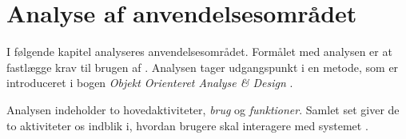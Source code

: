 \chapter{Analyse af anvendelsesområdet}
\label{chap:analyseafao}

I følgende kapitel analyseres anvendelsesområdet. Formålet med analysen er at fastlægge krav til brugen af \Foodl{}. Analysen tager udgangspunkt i en metode, som er introduceret i bogen \emph{Objekt Orienteret Analyse \& Design} \cite[s. ~113]{ooad}. 

Analysen indeholder to hovedaktiviteter, \textit{brug} og \textit{funktioner}. Samlet set giver de to aktiviteter os indblik i, hvordan brugere skal interagere med systemet %
\cite[s. ~115]{ooad}.




